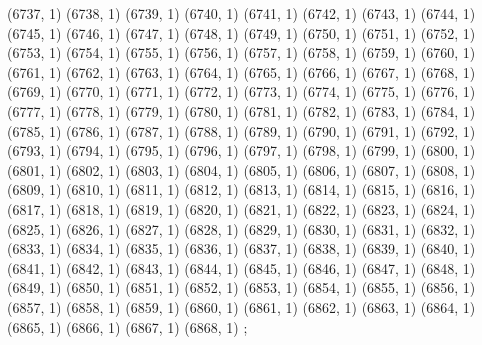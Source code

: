 {   (6737, 1)
   (6738, 1)
   (6739, 1)
   (6740, 1)
   (6741, 1)
   (6742, 1)
   (6743, 1)
   (6744, 1)
   (6745, 1)
   (6746, 1)
   (6747, 1)
   (6748, 1)
   (6749, 1)
   (6750, 1)
   (6751, 1)
   (6752, 1)
   (6753, 1)
   (6754, 1)
   (6755, 1)
   (6756, 1)
   (6757, 1)
   (6758, 1)
   (6759, 1)
   (6760, 1)
   (6761, 1)
   (6762, 1)
   (6763, 1)
   (6764, 1)
   (6765, 1)
   (6766, 1)
   (6767, 1)
   (6768, 1)
   (6769, 1)
   (6770, 1)
   (6771, 1)
   (6772, 1)
   (6773, 1)
   (6774, 1)
   (6775, 1)
   (6776, 1)
   (6777, 1)
   (6778, 1)
   (6779, 1)
   (6780, 1)
   (6781, 1)
   (6782, 1)
   (6783, 1)
   (6784, 1)
   (6785, 1)
   (6786, 1)
   (6787, 1)
   (6788, 1)
   (6789, 1)
   (6790, 1)
   (6791, 1)
   (6792, 1)
   (6793, 1)
   (6794, 1)
   (6795, 1)
   (6796, 1)
   (6797, 1)
   (6798, 1)
   (6799, 1)
   (6800, 1)
   (6801, 1)
   (6802, 1)
   (6803, 1)
   (6804, 1)
   (6805, 1)
   (6806, 1)
   (6807, 1)
   (6808, 1)
   (6809, 1)
   (6810, 1)
   (6811, 1)
   (6812, 1)
   (6813, 1)
   (6814, 1)
   (6815, 1)
   (6816, 1)
   (6817, 1)
   (6818, 1)
   (6819, 1)
   (6820, 1)
   (6821, 1)
   (6822, 1)
   (6823, 1)
   (6824, 1)
   (6825, 1)
   (6826, 1)
   (6827, 1)
   (6828, 1)
   (6829, 1)
   (6830, 1)
   (6831, 1)
   (6832, 1)
   (6833, 1)
   (6834, 1)
   (6835, 1)
   (6836, 1)
   (6837, 1)
   (6838, 1)
   (6839, 1)
   (6840, 1)
   (6841, 1)
   (6842, 1)
   (6843, 1)
   (6844, 1)
   (6845, 1)
   (6846, 1)
   (6847, 1)
   (6848, 1)
   (6849, 1)
   (6850, 1)
   (6851, 1)
   (6852, 1)
   (6853, 1)
   (6854, 1)
   (6855, 1)
   (6856, 1)
   (6857, 1)
   (6858, 1)
   (6859, 1)
   (6860, 1)
   (6861, 1)
   (6862, 1)
   (6863, 1)
   (6864, 1)
   (6865, 1)
   (6866, 1)
   (6867, 1)
   (6868, 1)
} ;
